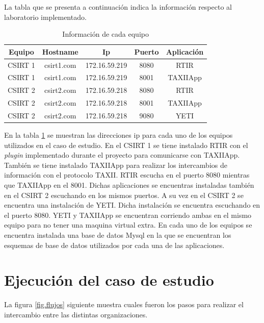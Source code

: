 La tabla que se presenta a continuación indica la información respecto al laboratorio implementado.
\renewcommand{\tablename}{Tabla}

\begin{table}
	\begin{center}
		\begin{tabular}{|c|c|c|c|c|}
			\hline
			Equipo & Hostname & Ip & Puerto & Aplicación \\ \hline
			CSIRT 1 & csirt1.com & 172.16.59.219 & 8080 & RTIR \\ \hline
			CSIRT 1 & csirt1.com & 172.16.59.219 & 8001 & TAXIIApp \\ \hline
			CSIRT 2 & csirt2.com & 172.16.59.218 & 8080 & RTIR \\ \hline
			CSIRT 2 & csirt2.com & 172.16.59.218 & 8001 & TAXIIApp \\ \hline
			CSIRT 2 & csirt2.com & 172.16.59.218 & 9080 & YETI \\ \hline
		\end{tabular}
	\end{center}
	\caption{Información de cada equipo}
	\label{tabla_equipos}
\end{table}

En la tabla \ref{tabla_equipos} se muestran las direcciones ip para cada uno de los equipos utilizados en el caso de estudio. En el CSIRT 1 se tiene instalado RTIR con el \textit{plugin} implementado durante el proyecto para comunicarse con TAXIIApp. También se tiene instalado TAXIIApp para realizar los intercambios de información con el protocolo TAXII. RTIR escucha en el puerto 8080 mientras que TAXIIApp en el 8001.
Dichas aplicaciones se encuentras instaladas también en el CSIRT 2 escuchando en los mismos puertos. A su vez en el CSIRT 2 se encuentra una instalación de YETI. Dicha instalación se encuentra escuchando en el puerto 8080. YETI y TAXIIApp se encuentran corriendo ambas en el mismo equipo para no tener una maquina virtual extra.
En cada uno de los equipos se encuentra instalada una base de datos Mysql en la que se encuentran los esquemas de base de datos utilizados por cada una de las aplicaciones.

\section{Ejecución del caso de estudio}
La figura \ref{fig.flujos} siguiente muestra cuales fueron los pasos para realizar el intercambio entre las distintas organizaciones.

